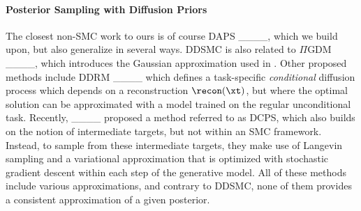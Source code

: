 \paragraph{Posterior Sampling with Diffusion Priors}
The closest non-SMC work to ours is of course DAPS ____, which we build upon, but also generalize in several ways. DDSMC is also related to $\Pi$GDM ____, which introduces the Gaussian approximation used in . %
Other proposed methods include DDRM ____ which defines a task-specific \emph{conditional} diffusion process which depends on a reconstruction $\recon(\xt)$, but where the optimal solution can be approximated with a model trained on the regular unconditional task. Recently, ____ proposed a method referred to as DCPS, which also builds on the notion of intermediate targets, but not within an SMC framework. Instead, to sample from these intermediate targets, they make use of Langevin sampling and a variational approximation that is optimized with stochastic gradient descent within each step of the generative model. 
All of these methods include various approximations, and contrary to DDSMC, none of them provides a consistent approximation of a given posterior.